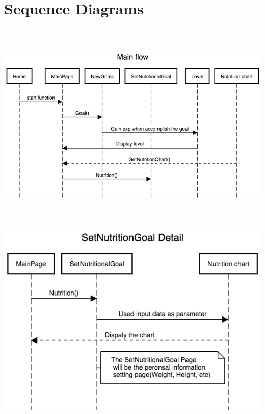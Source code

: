 \documentclass[a4paper]{article}
\begin{document}
\section{Sequence Diagrams}

\includegraphics[width=\textwidth,height=10cm]{Main_flow.png}
\newline
\newline
\includegraphics[width=\textwidth,height=10cm]{SetNutritionGoal_Detail.png}
\newline
\newline
\newline
\end{document}
